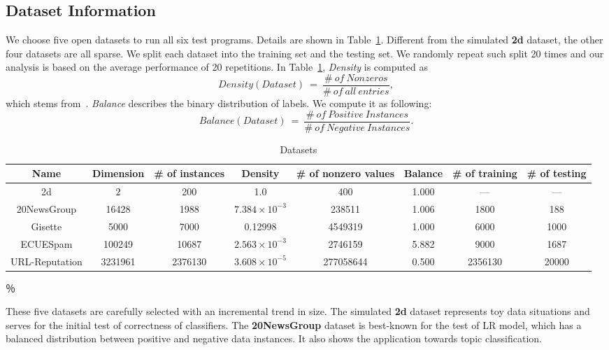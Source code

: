 \documentclass[10pt, conference, compsocconf]{IEEEtran}
\begin{document}
\subsection{Dataset Information}
We choose five open datasets to run all six test programs. Details are shown in Table~\ref{tab:table1}.	
Different from the simulated \textbf{2d} dataset, the other four datasets are all sparse.
We split each dataset into the training set and the testing set. We randomly repeat such split 20 times and our analysis is based on the average performance of 20 repetitions. In Table~\ref{tab:table1}, \textit{Density} is computed as
\[
Density(Dataset)~=~\frac{\#~of~Nonzeros}{\#~of~all~entries},
\]
which stems from~\cite{sarwar2001item}.
\textit{Balance} describes the binary distribution of labels.
We compute it as following:
\[
Balance(Dataset)~=~\frac{\#~of~Positive~Instances}{\#~of~Negative~Instances}.
\]
\begin{table}%
\centering
\caption{Datasets}\label{tab:table1}\vspace{-0.3cm}
\begin{tabular}{|c|c|c|c|c|c|c|c|}
\hline
    Name           & Dimension & \# of instances & Density  & \# of nonzero values & Balance & \# of training & \# of testing\\
\hline
    2d             & 2             & 200            & 1.0                      & 400          & 1.000 & --- & --- \\
\hline
    20NewsGroup    & 16428         & 1988           & $7.384\times10^{-3}$     & 238511          & 1.006 & 1800 & 188\\
\hline
    Gisette        & 5000          & 7000           & 0.12998                  & 4549319          & 1.000 & 6000 & 1000\\
\hline
    ECUESpam       & 100249        & 10687          & $2.563\times10^{-3}$     & 2746159          & 5.882 & 9000 & 1687\\
\hline
    URL-Reputation & 3231961       & 2376130        & $3.608\times10^{-5}$     & 277058644          & 0.500 & 2356130 & 20000\\
\hline
\end{tabular}
％\vspace{-0.3cm}
\end{table}
These five datasets are carefully selected with an incremental trend in size.
The simulated \textbf{2d} dataset represents toy data situations and serves for the initial test of correctness of classifiers.
The \textbf{20NewsGroup} dataset is best-known for the test of LR model, which has a balanced distribution between positive and negative data instances. It also shows the application towards topic classification.
\end{document}
